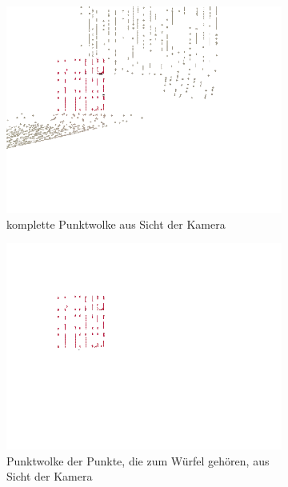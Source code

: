 \documentclass[ngerman,a4paper,parskip=half]{scrartcl}
\begin{document}
\begin{figure}[H]
	\centering
	\begin{subfigure}{0.45\textwidth}
		\includegraphics[width=\textwidth,frame]{includes/peak_red_cam.png}
		\caption{komplette Punktwolke aus Sicht der Kamera}
	\end{subfigure}
	\hfill
	\begin{subfigure}{0.45\textwidth}
		\includegraphics[width=\textwidth,frame]{includes/peak_only_red_cam.png}
		\caption{Punktwolke der Punkte, die zum Würfel gehören, aus Sicht der Kamera}
	\end{subfigure}
	\begin{subfigure}{0.45\textwidth}

\end{subfigure}
\end{figure}
\end{document}
